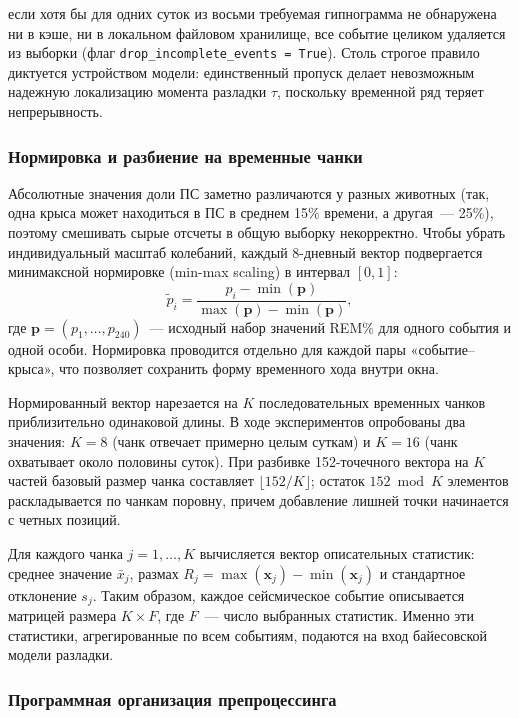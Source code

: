 \documentclass[14pt]{mmcs_article}
\begin{document}
если хотя бы для одних суток из восьми требуемая гипнограмма
не обнаружена ни в кэше, ни в локальном файловом хранилище,
все событие целиком удаляется из выборки (флаг
\texttt{drop\_incomplete\_events = True}). Столь строгое
правило диктуется устройством модели: единственный пропуск
делает невозможным надежную локализацию момента разладки
$\tau$, поскольку временной ряд теряет непрерывность.

\subsubsection*{Нормировка и разбиение на временные чанки}

Абсолютные значения доли ПС заметно различаются у разных
животных (так, одна крыса может находиться в ПС в среднем
15\% времени, а другая~--- 25\%), поэтому смешивать сырые
отсчеты в общую выборку некорректно. Чтобы убрать
индивидуальный масштаб колебаний, каждый 8-дневный вектор
подвергается минимаксной нормировке (min-max scaling) в
интервал $[0, 1]$:
\begin{equation}
	\tilde{p}_i = \frac{p_i - \min(\mathbf{p})}
	{\max(\mathbf{p}) - \min(\mathbf{p})},
\end{equation}
где $\mathbf{p} = (p_1, \dots, p_{240})$~--- исходный набор
значений REM\% для одного события и одной особи. Нормировка
проводится отдельно для каждой пары «событие--крыса», что
позволяет сохранить форму временного хода внутри окна.

Нормированный вектор нарезается на $K$ последовательных
временных чанков приблизительно одинаковой длины. В ходе
экспериментов опробованы два значения:
$K = 8$ (чанк отвечает примерно целым суткам) и
$K = 16$ (чанк охватывает около половины суток). При разбивке
152-точечного вектора на $K$ частей базовый размер чанка
составляет $\lfloor 152 / K \rfloor$; остаток
$152 \bmod K$ элементов раскладывается по чанкам поровну,
причем добавление лишней точки начинается с четных позиций.

Для каждого чанка $j = 1, \dots, K$ вычисляется вектор
описательных статистик: среднее значение $\bar{x}_j$, размах
$R_j = \max(\mathbf{x}_j) - \min(\mathbf{x}_j)$ и стандартное
отклонение $s_j$. Таким образом, каждое сейсмическое событие
описывается матрицей размера $K \times F$, где $F$~--- число
выбранных статистик. Именно эти статистики, агрегированные по
всем событиям, подаются на вход байесовской модели разладки.

\subsubsection*{Программная организация препроцессинга}
\end{document}
